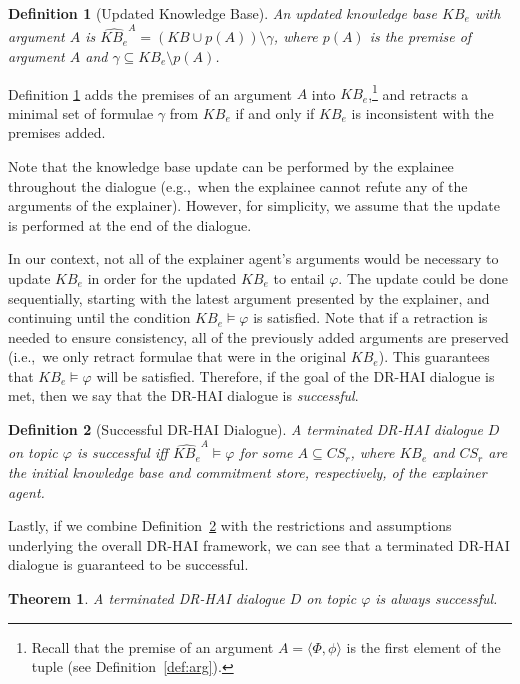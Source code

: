 \documentclass{ecai}
\newtheorem{theorem}{{\bf Theorem}}
\newtheorem{definition}{{\bf Definition}}
\begin{document}
\begin{definition}[Updated Knowledge Base]
    An \emph{updated knowledge base} $KB_e$ with argument $A$ is $\widehat{KB_e}^{A} = (KB \cup p(A))\setminus \gamma$, where $p(A)$ is the premise of argument $A$ and $\gamma \subseteq KB_e \setminus p(A)$.
    \label{def:kb_update}
\end{definition}

% 
Definition \ref{def:kb_update} adds the premises of an argument $A$ into $KB_e$,\footnote{Recall that the premise of an argument $A = \langle \Phi, \phi \rangle$ is the first element of the tuple (see Definition~\ref{def:arg}).}  and retracts a minimal set of formulae $\gamma$ from $KB_e$ if and only if $KB_e$ is inconsistent with the premises added. 


Note that the knowledge base update can be performed by the explainee throughout the dialogue (e.g.,~when the explainee cannot refute any of the arguments of the explainer). However, for simplicity, we assume that the update is performed at the end of the dialogue.

In our context, not all of the explainer agent's arguments would be necessary to update $KB_e$ in order for the updated $KB_e$ to entail $\varphi$. The update could be done sequentially, starting with the latest argument presented by the explainer, and continuing until the condition $KB_e \models \varphi$ is satisfied. Note that if a retraction is needed to ensure consistency, all of the previously added arguments are preserved (i.e.,~we only retract formulae that were in the original $KB_e$). This guarantees that $KB_e \models \varphi$ will be satisfied. Therefore, if the goal of the DR-HAI dialogue is met, then we say that the DR-HAI dialogue is \emph{successful}. 


\begin{definition}[Successful DR-HAI Dialogue]
    A terminated DR-HAI dialogue $D$ on topic $\varphi$ is \emph{successful} iff $\widehat{KB_e}^{A} \models \varphi$ for some $A \subseteq CS_r$, where $KB_e$ and $CS_r$ are the initial knowledge base and commitment store, respectively, of the explainer agent. 
    \label{def:succ}
\end{definition}

Lastly, if we combine Definition~\ref{def:succ} with the restrictions and assumptions underlying the overall DR-HAI framework, we can see that a terminated DR-HAI dialogue is guaranteed to be successful.

\begin{theorem}
    A terminated DR-HAI dialogue $D$ on topic $\varphi$ is always successful.
    \label{succ_theo}
\end{theorem}
\end{document}
